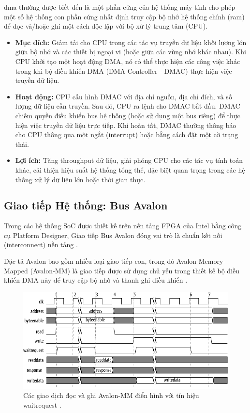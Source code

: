 \acrfull{dma} thường được biết đến là một phần cứng của hệ thống máy tính cho phép một số hệ thống con phần cứng nhất định truy cập bộ nhớ hệ thống chính (\acrshort{ram}) để đọc và/hoặc ghi một cách độc lập với bộ xử lý trung tâm (CPU).

\begin{itemize}
    \item \textbf{Mục đích:} Giảm tải cho CPU trong các tác vụ truyền dữ liệu khối lượng lớn giữa bộ nhớ và các thiết bị ngoại vi (hoặc giữa các vùng nhớ khác nhau). Khi CPU khởi tạo một hoạt động DMA, nó có thể thực hiện các công việc khác trong khi bộ điều khiển DMA (DMA Controller - DMAC) thực hiện việc truyền dữ liệu.
    \item \textbf{Hoạt động:} CPU cấu hình DMAC với địa chỉ nguồn, địa chỉ đích, và số lượng dữ liệu cần truyền. Sau đó, CPU ra lệnh cho DMAC bắt đầu. DMAC chiếm quyền điều khiển bus hệ thống (hoặc sử dụng một bus riêng) để thực hiện việc truyền dữ liệu trực tiếp. Khi hoàn tất, DMAC thường thông báo cho CPU thông qua một ngắt (interrupt) hoặc bằng cách đặt một cờ trạng thái.
    \item \textbf{Lợi ích:} Tăng throughput dữ liệu, giải phóng CPU cho các tác vụ tính toán khác, cải thiện hiệu suất hệ thống tổng thể, đặc biệt quan trọng trong các hệ thống xử lý dữ liệu lớn hoặc thời gian thực.
\end{itemize}

\subsection{Giao tiếp Hệ thống: Bus Avalon}
\label{sec:avalon_bus}
Trong các hệ thống SoC được thiết kế trên nền tảng FPGA của Intel bằng công cụ Platform Designer, Giao tiếp Bus Avalon đóng vai trò là chuẩn kết nối (interconnect) nền tảng \cite{avalon_mm_transfer}. 

Đặc tả Avalon bao gồm nhiều loại giao tiếp con, trong đó Avalon Memory-Mapped (Avalon-MM) là giao tiếp được sử dụng chủ yếu trong thiết kế bộ điều khiển DMA này để truy cập bộ nhớ và thanh ghi điều khiển \cite{avalon_mm_transfer}.

\begin{figure}[htbp]
    \centering
    \includegraphics[width=\linewidth]{Images/02_01_Avalon_MM_Transfers.pdf}
    \caption{Các giao dịch đọc và ghi Avalon-MM điển hình với tín hiệu waitrequest \cite{avalon_mm_transfer}.}
    \label{fig:02_01_avalon_mm_transfer}
\end{figure}

